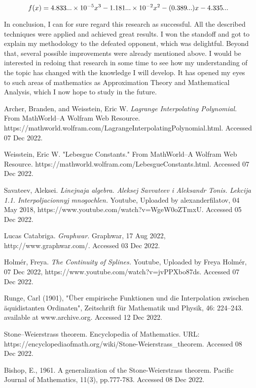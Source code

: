 \documentclass[12pt, titlepage]{article}
\begin{document}
$$f(x) = 4.833\smalldots \times 10^{-5} x^3- 1.181\smalldots{} \times 10^{-2} x^2 - (0.389\smalldots{}) x - 4.335\smalldots$$

In conclusion, I can for sure regard this research as successful. All the
described techniques were applied and achieved great results. I won the
standoff and got to explain my methodology to the defeated opponent, which
was delightful. Beyond that, several possible improvements were already 
mentioned above. I would be interested in redoing that research in some time
to see how my understanding of the topic has changed with the knowledge I will
develop. It has opened my eyes to such areas of mathematics as  Approximation Theory and Mathematical Analysis, which I now hope to study in the future.

\begin{thebibliography}{1}

Archer, Branden, and Weisstein, Eric W. {\em Lagrange Interpolating Polynomial.}
From MathWorld--A Wolfram Web Resource. https://mathworld.wolfram.com/LagrangeInterpolatingPolynomial.html.  Accessed 07 Dec 2022.

Weisstein, Eric W. "Lebesgue Constants." From MathWorld--A Wolfram Web Resource. https://mathworld.wolfram.com/LebesgueConstants.html. Accessed 07 Dec 2022.

Savateev, Aleksei. {\em Linejnaja algebra. Aleksej Savvateev i Aleksandr Tonis. Lekcija 1.1. Interpoljacionnyj mnogochlen.}
Youtube, Uploaded by alexanderfilatov, 04 May 2018, https://www.youtube.com/watch?v=WgeW0oZTmxU. Accessed 05 Dec 2022.

Lucas Catabriga. {\em Graphwar.} Graphwar, 17 Aug 2022, http://www.graphwar.com/. Accessed 03 Dec 2022.

Holm\'{e}r, Freya. {\em The Continuity of Splines.}
Youtube, Uploaded by Freya Holm\'{e}r, 07 Dec 2022, https://www.youtube.com/watch?v=jvPPXbo87ds. Accessed 07 Dec 2022.

Runge, Carl (1901), "Über empirische Funktionen und die Interpolation zwischen äquidistanten Ordinaten", Zeitschrift für Mathematik und Physik, 46: 224–243. available at www.archive.org. Accessed 12 Dec 2022.

Stone–Weierstrass theorem. Encyclopedia of Mathematics. URL: https://encyclopediaofmath.org/wiki/Stone-Weierstrass\_theorem. Accessed 08 Dec 2022.

Bishop, E., 1961. A generalization of the Stone-Weierstrass theorem. Pacific Journal of Mathematics, 11(3), pp.777-783. Accessed 08 Dec 2022.

\end{thebibliography}
\end{document}
